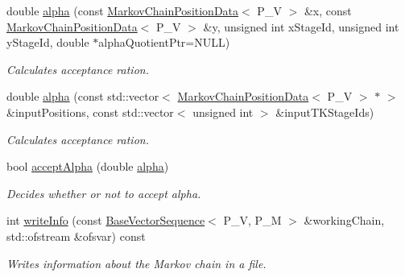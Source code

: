 \begin{DoxyCompactItemize}
double \hyperlink{class_q_u_e_s_o_1_1_metropolis_hastings_s_g_ad5c2b3afd5e845ea22518536274a8dd7}{alpha} (const \hyperlink{class_q_u_e_s_o_1_1_markov_chain_position_data}{Markov\-Chain\-Position\-Data}$<$ P\-\_\-\-V $>$ \&x, const \hyperlink{class_q_u_e_s_o_1_1_markov_chain_position_data}{Markov\-Chain\-Position\-Data}$<$ P\-\_\-\-V $>$ \&y, unsigned int x\-Stage\-Id, unsigned int y\-Stage\-Id, double $\ast$alpha\-Quotient\-Ptr=N\-U\-L\-L)
\begin{DoxyCompactList}\small\item\em Calculates acceptance ration. \end{DoxyCompactList}\item 
double \hyperlink{class_q_u_e_s_o_1_1_metropolis_hastings_s_g_a2adeca5cc9cf99ea0b209eacfa42bd83}{alpha} (const std\-::vector$<$ \hyperlink{class_q_u_e_s_o_1_1_markov_chain_position_data}{Markov\-Chain\-Position\-Data}$<$ P\-\_\-\-V $>$ $\ast$ $>$ \&input\-Positions, const std\-::vector$<$ unsigned int $>$ \&input\-T\-K\-Stage\-Ids)
\begin{DoxyCompactList}\small\item\em Calculates acceptance ration. \end{DoxyCompactList}\item 
bool \hyperlink{class_q_u_e_s_o_1_1_metropolis_hastings_s_g_abef3a3b60bc10db208864f6db09eeea8}{accept\-Alpha} (double \hyperlink{class_q_u_e_s_o_1_1_metropolis_hastings_s_g_ad5c2b3afd5e845ea22518536274a8dd7}{alpha})
\begin{DoxyCompactList}\small\item\em Decides whether or not to accept alpha. \end{DoxyCompactList}\item 
int \hyperlink{class_q_u_e_s_o_1_1_metropolis_hastings_s_g_ae354fe11a3f89df768b15f1743567db2}{write\-Info} (const \hyperlink{class_q_u_e_s_o_1_1_base_vector_sequence}{Base\-Vector\-Sequence}$<$ P\-\_\-\-V, P\-\_\-\-M $>$ \&working\-Chain, std\-::ofstream \&ofsvar) const 
\begin{DoxyCompactList}\small\item\em Writes information about the Markov chain in a file. \end{DoxyCompactList}\end{DoxyCompactItemize}
